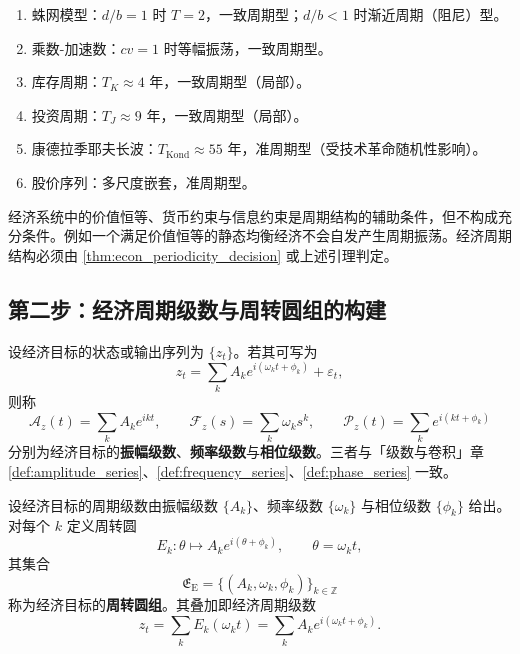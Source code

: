 \begin{example}[经济周期判定实例]\label{ex:econ_periodic_examples}
\begin{enumerate}[label=(\roman*)]
    \item 蛛网模型：$d/b=1$ 时 $T=2$，一致周期型；$d/b<1$ 时渐近周期（阻尼）型。
    \item 乘数-加速数：$cv=1$ 时等幅振荡，一致周期型。
    \item 库存周期：$T_K\approx4$ 年，一致周期型（局部）。
    \item 投资周期：$T_J\approx9$ 年，一致周期型（局部）。
    \item 康德拉季耶夫长波：$T_{\mathrm{Kond}}\approx55$ 年，准周期型（受技术革命随机性影响）。
    \item 股价序列：多尺度嵌套，准周期型。
\end{enumerate}
\end{example}

\begin{remark}[守恒量不保证周期]\label{rem:econ_invariant_not_period}
经济系统中的价值恒等、货币约束与信息约束是周期结构的辅助条件，但不构成充分条件。例如一个满足价值恒等的静态均衡经济不会自发产生周期振荡。经济周期结构必须由 \cref{thm:econ_periodicity_decision} 或上述引理判定。
\end{remark}

\subsection{第二步：经济周期级数与周转圆组的构建}

\begin{definition}\label{def:econ_series}
设经济目标的状态或输出序列为 $\{z_t\}$。若其可写为
\[
z_t=\sum_k A_k e^{i(\omega_k t+\phi_k)}+\varepsilon_t,
\]
则称
\[
\mathcal A_z(t)=\sum_k A_k e^{ikt},\qquad
\mathcal F_z(s)=\sum_k \omega_k s^k,\qquad
\mathcal P_z(t)=\sum_k e^{i(kt+\phi_k)}
\]
分别为经济目标的\textbf{振幅级数}、\textbf{频率级数}与\textbf{相位级数}。三者与「级数与卷积」章 \cref{def:amplitude_series}、\cref{def:frequency_series}、\cref{def:phase_series} 一致。
\end{definition}

\begin{definition}[经济周转圆组]\label{def:econ_epicycle_group}
设经济目标的周期级数由振幅级数 $\{A_k\}$、频率级数 $\{\omega_k\}$ 与相位级数 $\{\phi_k\}$ 给出。对每个 $k$ 定义周转圆
\[
E_k:\theta\mapsto A_k e^{i(\theta+\phi_k)},\qquad \theta=\omega_k t,
\]
其集合
\[
\mathfrak E_{\mathrm{E}}=\{(A_k,\omega_k,\phi_k)\}_{k\in\mathbb Z}
\]
称为经济目标的\textbf{周转圆组}。其叠加即经济周期级数
\[
z_t=\sum_k E_k(\omega_k t)=\sum_k A_k e^{i(\omega_k t+\phi_k)}.
\]
\end{definition}

